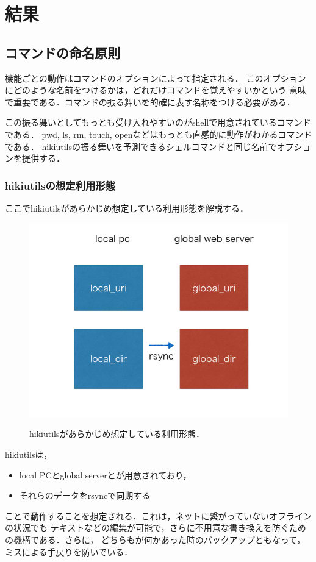 
\section{結果}
\subsection{コマンドの命名原則}
機能ごとの動作はコマンドのオプションによって指定される．
このオプションにどのような名前をつけるかは，どれだけコマンドを覚えやすいかという
意味で重要である．コマンドの振る舞いを的確に表す名称をつける必要がある．

この振る舞いとしてもっとも受け入れやすいのがshellで用意されているコマンドである．
pwd, ls, rm, touch, openなどはもっとも直感的に動作がわかるコマンドである．
hikiutilsの振る舞いを予測できるシェルコマンドと同じ名前でオプションを提供する．

\subsubsection{hikiutilsの想定利用形態}
ここでhikiutilsがあらかじめ想定している利用形態を解説する．

\begin{figure}[htbp]\begin{center}
\includegraphics[width=12cm,bb= 0 0 737 553]{../figs/./hikiutils_yamane.002.jpg}
\caption{hikiutilsがあらかじめ想定している利用形態．}
\label{fig:002}
\label{default}\end{center}\end{figure}
hikiutilsは，

\begin{itemize}
\item local PCとglobal serverとが用意されており，
\item それらのデータをrsyncで同期する
\end{itemize}
ことで動作することを想定される．これは，ネットに繋がっていないオフラインの状況でも
テキストなどの編集が可能で，さらに不用意な書き換えを防ぐための機構である．さらに，
どちらもが何かあった時のバックアップともなって，ミスによる手戻りを防いでいる．

